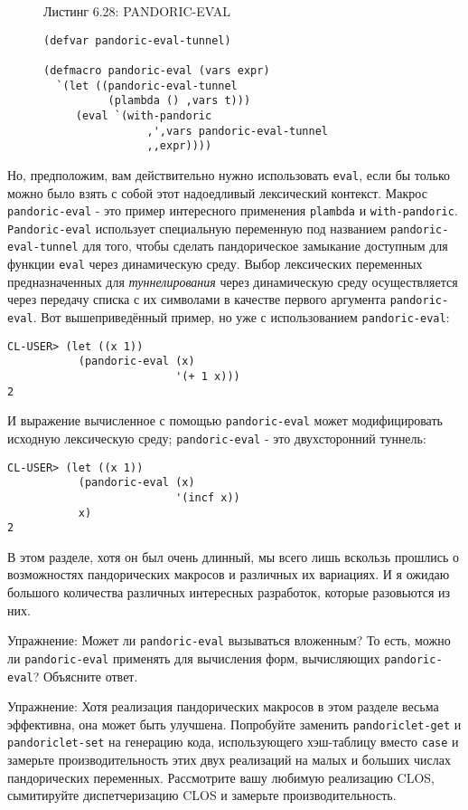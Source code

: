 \begin{figure}Листинг 6.28: PANDORIC-EVAL\label{listing_6.28}
\listbegin
\begin{verbatim}
(defvar pandoric-eval-tunnel)

(defmacro pandoric-eval (vars expr)
  `(let ((pandoric-eval-tunnel
          (plambda () ,vars t)))
     (eval `(with-pandoric
                ,',vars pandoric-eval-tunnel
                ,,expr))))
\end{verbatim}
\listend
\end{figure}

Но, предположим, вам действительно нужно использовать \verb"eval", если бы только можно было взять с собой этот надоедливый лексический контекст. Макрос \verb"pandoric-eval" - это пример интересного применения \verb"plambda" и \verb"with-pandoric". \verb"Pandoric-eval" использует специальную переменную под названием \verb"pandoric-eval-tunnel" для того, чтобы сделать пандорическое замыкание доступным для функции \verb"eval" через динамическую среду. Выбор лексических переменных предназначенных для \emph{туннелирования} через динамическую среду осуществляется через передачу списка с их символами в качестве первого аргумента \verb"pandoric-eval". Вот вышеприведённый пример, но уже с использованием \verb"pandoric-eval":

\begin{verbatim}
CL-USER> (let ((x 1))
           (pandoric-eval (x)
                          '(+ 1 x)))
2
\end{verbatim}

И выражение вычисленное с помощью \verb"pandoric-eval" может модифицировать исходную лексическую среду; \verb"pandoric-eval" - это двухсторонний туннель:

\begin{verbatim}
CL-USER> (let ((x 1))
           (pandoric-eval (x)
                          '(incf x))
           x)
2
\end{verbatim}

В этом разделе, хотя он был очень длинный, мы всего лишь вскользь прошлись о возможностях пандорических макросов и различных их вариациях. И я ожидаю большого количества различных интересных разработок, которые разовьются из них.

Упражнение: Может ли \verb"pandoric-eval" вызываться вложенным? То есть, можно ли \verb"pandoric-eval" применять для вычисления форм, вычисляющих \verb"pandoric-eval"? Объясните ответ.

Упражнение: Хотя реализация пандорических макросов в этом разделе весьма эффективна, она может быть улучшена. Попробуйте заменить \verb"pandoriclet-get" и \verb"pandoriclet-set" на генерацию кода, использующего хэш-таблицу вместо \verb"case" и замерьте производительность этих двух реализаций на малых и больших числах пандорических переменных. Рассмотрите вашу любимую реализацию CLOS, сымитируйте диспетчеризацию CLOS и замерьте производительность.
